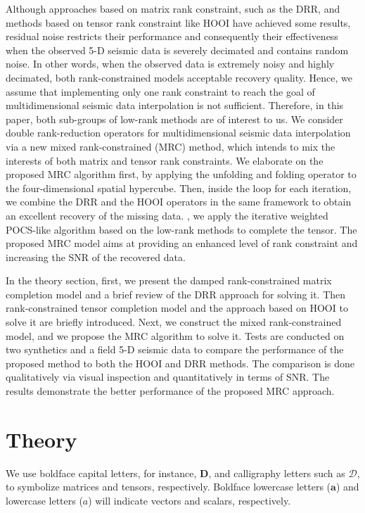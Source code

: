 Although approaches based on matrix rank constraint, such as the DRR, and methods based on tensor rank constraint like HOOI have achieved some results, residual noise restricts their performance and consequently their effectiveness when the observed 5-D seismic data is severely decimated and contains  random noise. In other words, when the observed data is extremely noisy and highly decimated, both rank-constrained models  acceptable recovery quality. Hence, we assume that implementing only one rank constraint to reach the goal of multidimensional seismic data interpolation is not sufficient. Therefore, in this paper, both sub-groups of low-rank methods are of interest to us. We consider double rank-reduction operators for multidimensional seismic data interpolation via a new mixed rank-constrained (MRC) method, which intends to mix the interests of both matrix and tensor rank constraints. We elaborate on the proposed MRC algorithm first, by applying the unfolding and folding operator to the four-dimensional spatial hypercube. Then, inside the loop for each iteration, we combine the DRR and the HOOI operators in the same framework to obtain an excellent recovery of the missing data. , we apply the iterative weighted POCS-like algorithm based on the low-rank methods to complete the tensor. The proposed MRC model aims at providing an enhanced level of rank constraint and increasing the SNR of the recovered data. 

In the theory section, first, we present the damped rank-constrained matrix completion model and a brief review of the DRR approach for solving it. Then\dlo{,}  rank-constrained tensor completion model and the approach based on HOOI to solve it are briefly introduced. Next, we construct the mixed rank-constrained model, and we propose the MRC algorithm to solve it. Tests are conducted on two synthetics and a field 5-D seismic data to compare the performance of the proposed method to both the HOOI and DRR methods. The comparison is done qualitatively via visual inspection and quantitatively in terms of SNR. The results demonstrate the better performance of the proposed MRC approach. 

\section{Theory}

We use boldface capital letters, for instance, $\mathbf{D}$, and calligraphy letters such as $\mathcal{D}$, to symbolize matrices and tensors, respectively. Boldface lowercase letters ($\mathbf{a}$) and lowercase letters (${a}$)\dlo{,} will indicate vectors and scalars, respectively.

